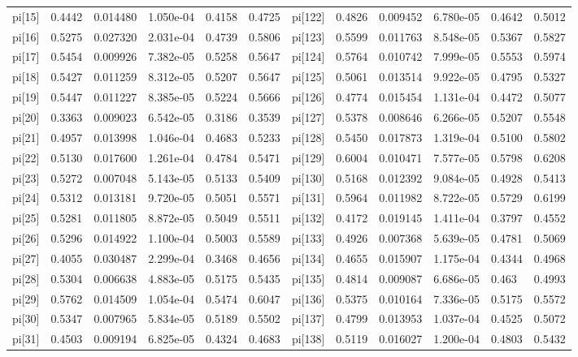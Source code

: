 \documentclass[12pt]{article}
\begin{document}
\begin{table}[h!]
\begin{tabular}{|llllll|llllll|}
pi[15] & 0.4442  & 0.014480  & 1.050e-04 & 0.4158 &0.4725 & pi[122] & 0.4826 & 0.009452  & 6.780e-05 & 0.4642 &0.5012 \\ 
pi[16] & 0.5275  & 0.027320  & 2.031e-04 & 0.4739 &0.5806 & pi[123] & 0.5599 & 0.011763   & 8.548e-05 & 0.5367 &0.5827 \\ 
pi[17] & 0.5454  & 0.009926  & 7.382e-05 & 0.5258 &0.5647 & pi[124] & 0.5764 & 0.010742   & 7.999e-05 & 0.5553 &0.5974 \\ 
pi[18] & 0.5427  & 0.011259  & 8.312e-05 & 0.5207 &0.5647 & pi[125] & 0.5061 & 0.013514  & 9.922e-05 & 0.4795 & 0.5327\\ 
pi[19] & 0.5447  & 0.011227  & 8.385e-05 & 0.5224 &0.5666 &pi[126] & 0.4774 & 0.015454  & 1.131e-04 & 0.4472 &0.5077 \\ 
pi[20] & 0.3363  & 0.009023  & 6.542e-05 & 0.3186 &0.3539 & pi[127] & 0.5378 & 0.008646  & 6.266e-05 & 0.5207 &0.5548 \\ 
pi[21] & 0.4957 & 0.013998   & 1.046e-04 & 0.4683 &0.5233 & pi[128] & 0.5450 & 0.017873  & 1.319e-04 & 0.5100 &0.5802 \\
pi[22] & 0.5130 & 0.017600   & 1.261e-04 & 0.4784 &0.5471 & pi[129] & 0.6004 & 0.010471  & 7.577e-05 & 0.5798 &0.6208 \\
pi[23] & 0.5272 & 0.007048   & 5.143e-05 & 0.5133 &0.5409 & pi[130] & 0.5168 & 0.012392  & 9.084e-05 & 0.4928 &0.5413 \\
pi[24] & 0.5312 & 0.013181   & 9.720e-05 & 0.5051 &0.5571 & pi[131] & 0.5964 & 0.011982   & 8.722e-05 & 0.5729 &0.6199 \\
pi[25] & 0.5281 & 0.011805   & 8.872e-05 & 0.5049 &0.5511 & pi[132] & 0.4172 & 0.019145  & 1.411e-04 & 0.3797 &0.4552 \\
pi[26] & 0.5296 & 0.014922   & 1.100e-04 & 0.5003 &0.5589 & pi[133] & 0.4926 & 0.007368   & 5.639e-05 & 0.4781 &0.5069 \\
pi[27] & 0.4055 & 0.030487   & 2.299e-04 & 0.3468 &0.4656 & pi[134] & 0.4655 & 0.015907  & 1.175e-04 & 0.4344 &0.4968 \\
pi[28] & 0.5304 & 0.006638   & 4.883e-05 & 0.5175 &0.5435 & pi[135] & 0.4814 & 0.009087  & 6.686e-05 & 0.463 & 0.4993 \\
pi[29] & 0.5762 & 0.014509   & 1.054e-04 & 0.5474 &0.6047 & pi[136] & 0.5375 & 0.010164  & 7.336e-05 & 0.5175 &0.5572 \\
pi[30] & 0.5347 & 0.007965   & 5.834e-05 & 0.5189 &0.5502 & pi[137] & 0.4799 & 0.013953  & 1.037e-04 & 0.4525 &0.5072 \\
pi[31] & 0.4503 & 0.009194   & 6.825e-05 & 0.4324 &0.4683 & pi[138] & 0.5119 & 0.016027   & 1.200e-04 & 0.4803 &0.5432 \\

\end{tabular}
\end{table}
\end{document}
